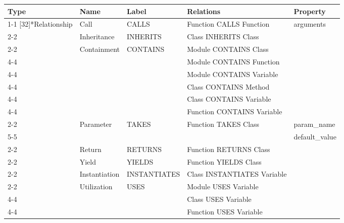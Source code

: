 \begin{tabularx}{\textwidth}{p{1.8cm}llXl}
\toprule
\textbf{Type} & \textbf{Name} & \textbf{Label} & \textbf{Relations} & \textbf{Property} \\
\cmidrule{1-1}\cmidrule{2-2}\cmidrule{3-3}\cmidrule{4-4}\cmidrule{5-5}
\multirow{16}[32]{*}{Relationship} & Call & \textsf{CALLS} & \textsf{Function} \textsf{CALLS} \textsf{Function} & \textsf{arguments} \\
\cmidrule{2-2}\cmidrule{3-3}\cmidrule{4-4}\cmidrule{5-5}
 & Inheritance & \textsf{INHERITS} & \textsf{Class} \textsf{INHERITS} \textsf{Class} &  \\
\cmidrule{2-2}\cmidrule{3-3}\cmidrule{4-4}
 & \multirow{6}[12]{*}{Containment} & \multirow{6}[12]{*}{\textsf{CONTAINS}} & \textsf{Module} \textsf{CONTAINS} \textsf{Class} &  \\
\cmidrule{4-4}
 &  &  & \textsf{Module} \textsf{CONTAINS} \textsf{Function} &  \\
\cmidrule{4-4}
 &  &  & \textsf{Module} \textsf{CONTAINS} \textsf{Variable} &  \\
\cmidrule{4-4}
 &  &  & \textsf{Class} \textsf{CONTAINS} \textsf{Method} &  \\
\cmidrule{4-4}
 &  &  & \textsf{Class} \textsf{CONTAINS} \textsf{Variable} &  \\
\cmidrule{4-4}
 &  &  & \textsf{Function} \textsf{CONTAINS} \textsf{Variable} &  \\
\cmidrule{2-2}\cmidrule{3-3}\cmidrule{4-4}\cmidrule{5-5}
 & \multirow{2}[4]{*}{Parameter} & \multirow{2}[4]{*}{\textsf{TAKES}} & \multirow{2}[4]{*}{\textsf{Function} \textsf{TAKES} \textsf{Class}} & param\_\textsf{name} \\
\cmidrule{5-5}
 &  &  &  & \textsf{default\_value} \\
\cmidrule{2-2}\cmidrule{3-3}\cmidrule{4-4}\cmidrule{5-5}
 & Return & \textsf{RETURNS} & \textsf{Function} \textsf{RETURNS} \textsf{Class} &  \\
\cmidrule{2-2}\cmidrule{3-3}\cmidrule{4-4}
 & Yield & \textsf{YIELDS} & \textsf{Function} \textsf{YIELDS} \textsf{Class} &  \\
\cmidrule{2-2}\cmidrule{3-3}\cmidrule{4-4}
 & Instantiation & \textsf{INSTANTIATES} & \textsf{Class} \textsf{INSTANTIATES} \textsf{Variable} &  \\
\cmidrule{2-2}\cmidrule{3-3}\cmidrule{4-4}
 & \multirow{3}[6]{*}{Utilization} & \multirow{3}[6]{*}{\textsf{USES}} & \textsf{Module} \textsf{USES} \textsf{Variable} &  \\
\cmidrule{4-4}
 &  &  & \textsf{Class} \textsf{USES} \textsf{Variable} &  \\
\cmidrule{4-4}
 &  &  & \textsf{Function} \textsf{USES} \textsf{Variable} &  \\
\bottomrule
\end{tabularx}

